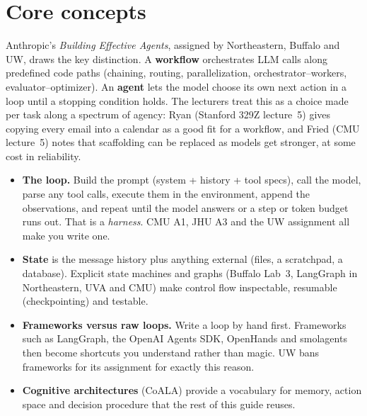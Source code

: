 \documentclass[10pt,oneside]{report}
\begin{document}
\section{Core concepts}
Anthropic's \emph{Building Effective Agents}, assigned by Northeastern, Buffalo and UW, draws the key distinction. A \textbf{workflow} orchestrates LLM calls along predefined code paths (chaining, routing, parallelization, orchestrator--workers, evaluator--optimizer). An \textbf{agent} lets the model choose its own next action in a loop until a stopping condition holds. The lecturers treat this as a choice made per task along a spectrum of agency: Ryan (Stanford 329Z lecture~5) gives copying every email into a calendar as a good fit for a workflow, and Fried (CMU lecture~5) notes that scaffolding can be replaced as models get stronger, at some cost in reliability.
\begin{itemize}
\item \textbf{The loop.} Build the prompt (system + history + tool specs), call the model, parse any tool calls, execute them in the environment, append the observations, and repeat until the model answers or a step or token budget runs out. That is a \emph{harness}. CMU A1, JHU A3 and the UW assignment all make you write one.
\item \textbf{State} is the message history plus anything external (files, a scratchpad, a database). Explicit state machines and graphs (Buffalo Lab~3, LangGraph in Northeastern, UVA and CMU) make control flow inspectable, resumable (checkpointing) and testable.
\item \textbf{Frameworks versus raw loops.} Write a loop by hand first. Frameworks such as LangGraph, the OpenAI Agents SDK, OpenHands and smolagents then become shortcuts you understand rather than magic. UW bans frameworks for its assignment for exactly this reason.
\item \textbf{Cognitive architectures} (CoALA) provide a vocabulary for memory, action space and decision procedure that the rest of this guide reuses.
\end{itemize}
\end{document}
